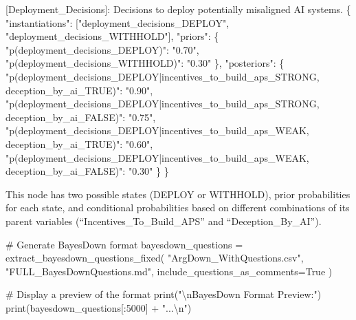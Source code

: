 \documentclass[
  11pt,
  letterpaper,
]{book}
\newenvironment{Shaded}{\begin{snugshade}}{\end{snugshade}}
\newcommand{\BuiltInTok}[1]{\textcolor[rgb]{0.00,0.23,0.31}{#1}}
\newcommand{\CharTok}[1]{\textcolor[rgb]{0.13,0.47,0.30}{#1}}
\newcommand{\CommentTok}[1]{\textcolor[rgb]{0.37,0.37,0.37}{#1}}
\newcommand{\DataTypeTok}[1]{\textcolor[rgb]{0.68,0.00,0.00}{#1}}
\newcommand{\DecValTok}[1]{\textcolor[rgb]{0.68,0.00,0.00}{#1}}
\newcommand{\ErrorTok}[1]{\textcolor[rgb]{0.68,0.00,0.00}{#1}}
\newcommand{\FunctionTok}[1]{\textcolor[rgb]{0.28,0.35,0.67}{#1}}
\newcommand{\NormalTok}[1]{\textcolor[rgb]{0.00,0.23,0.31}{#1}}
\newcommand{\OperatorTok}[1]{\textcolor[rgb]{0.37,0.37,0.37}{#1}}
\newcommand{\OtherTok}[1]{\textcolor[rgb]{0.00,0.23,0.31}{#1}}
\newcommand{\StringTok}[1]{\textcolor[rgb]{0.13,0.47,0.30}{#1}}
\newcommand{\VariableTok}[1]{\textcolor[rgb]{0.07,0.07,0.07}{#1}}
\begin{document}
\begin{landscape}
\begin{Shaded}
\begin{Highlighting}[]
\OtherTok{[}\ErrorTok{Deployment\_Decisions}\OtherTok{]}\ErrorTok{:} \ErrorTok{Decisions} \ErrorTok{to} \ErrorTok{deploy} \ErrorTok{potentially} \ErrorTok{misaligned} \ErrorTok{AI} \ErrorTok{systems.} \FunctionTok{\{}
  \DataTypeTok{"instantiations"}\FunctionTok{:} \OtherTok{[}\StringTok{"deployment\_decisions\_DEPLOY"}\OtherTok{,} \StringTok{"deployment\_decisions\_WITHHOLD"}\OtherTok{]}\FunctionTok{,}
  \DataTypeTok{"priors"}\FunctionTok{:} \FunctionTok{\{}
    \DataTypeTok{"p(deployment\_decisions\_DEPLOY)"}\FunctionTok{:} \StringTok{"0.70"}\FunctionTok{,}
    \DataTypeTok{"p(deployment\_decisions\_WITHHOLD)"}\FunctionTok{:} \StringTok{"0.30"}
  \FunctionTok{\},}
  \DataTypeTok{"posteriors"}\FunctionTok{:} \FunctionTok{\{}
    \DataTypeTok{"p(deployment\_decisions\_DEPLOY|incentives\_to\_build\_aps\_STRONG, deception\_by\_ai\_TRUE)"}\FunctionTok{:} \StringTok{"0.90"}\FunctionTok{,}
    \DataTypeTok{"p(deployment\_decisions\_DEPLOY|incentives\_to\_build\_aps\_STRONG, deception\_by\_ai\_FALSE)"}\FunctionTok{:} \StringTok{"0.75"}\FunctionTok{,}
    \DataTypeTok{"p(deployment\_decisions\_DEPLOY|incentives\_to\_build\_aps\_WEAK, deception\_by\_ai\_TRUE)"}\FunctionTok{:} \StringTok{"0.60"}\FunctionTok{,}
    \DataTypeTok{"p(deployment\_decisions\_DEPLOY|incentives\_to\_build\_aps\_WEAK, deception\_by\_ai\_FALSE)"}\FunctionTok{:} \StringTok{"0.30"}
  \FunctionTok{\}}
\FunctionTok{\}}
\end{Highlighting}
\end{Shaded}

This node has two possible states (DEPLOY or WITHHOLD), prior
probabilities for each state, and conditional probabilities based on
different combinations of its parent variables
(``Incentives\_To\_Build\_APS'' and ``Deception\_By\_AI'').

\label{generate_bayesdown}
\begin{Shaded}
\begin{Highlighting}[]
\CommentTok{\# Generate BayesDown format}
\NormalTok{bayesdown\_questions }\OperatorTok{=}\NormalTok{ extract\_bayesdown\_questions\_fixed(}
    \StringTok{"ArgDown\_WithQuestions.csv"}\NormalTok{,}
    \StringTok{"FULL\_BayesDownQuestions.md"}\NormalTok{,}
\NormalTok{    include\_questions\_as\_comments}\OperatorTok{=}\VariableTok{True}
\NormalTok{)}

\CommentTok{\# Display a preview of the format}
\BuiltInTok{print}\NormalTok{(}\StringTok{"}\CharTok{\textbackslash{}n}\StringTok{BayesDown Format Preview:"}\NormalTok{)}
\BuiltInTok{print}\NormalTok{(bayesdown\_questions[:}\DecValTok{5000}\NormalTok{] }\OperatorTok{+} \StringTok{"...}\CharTok{\textbackslash{}n}\StringTok{"}\NormalTok{)}
\end{Highlighting}
\end{Shaded}


\end{landscape}
\end{document}
